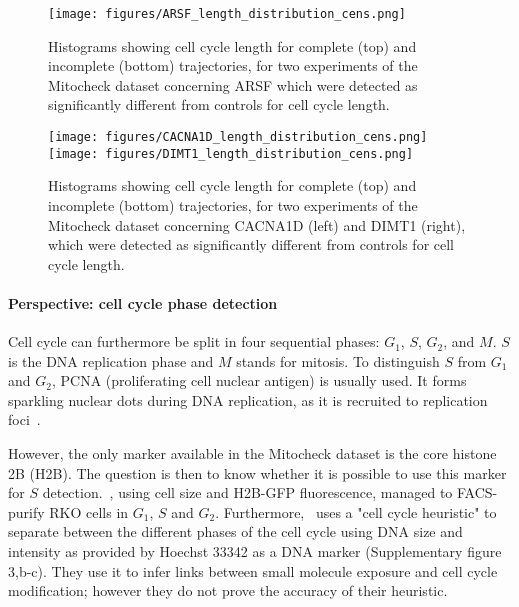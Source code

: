 \begin{figure*}[ht!]
\centerline{\texttt{[image: figures/ARSF\_length\_distribution\_cens.png]}}
\caption{Histograms showing cell cycle length for complete (top) and incomplete (bottom) trajectories, for two experiments of the Mitocheck dataset concerning ARSF which were detected as significantly different from controls for cell cycle length.}
\label{ARSF}
\end{figure*}
\begin{figure*}[ht!]
\centerline{\texttt{[image: figures/CACNA1D\_length\_distribution\_cens.png]}
\texttt{[image: figures/DIMT1\_length\_distribution\_cens.png]}
}
\caption{Histograms showing cell cycle length for complete (top) and incomplete (bottom) trajectories, for two experiments of the Mitocheck dataset concerning CACNA1D (left) and DIMT1 (right), which were detected as significantly different from controls for cell cycle length.}
\label{CAC}
\end{figure*}

\paragraph*{Perspective: cell cycle phase detection\\}
Cell cycle can furthermore be split in four sequential phases: $G_1$, $S$, $G_2$, and $M$. $S$ is the DNA replication phase and $M$ stands for mitosis. To distinguish $S$ from $G_1$ and $G_2$, PCNA (proliferating cell nuclear antigen) is usually used. It forms sparkling nuclear dots during DNA replication, as it is recruited to replication foci~\cite{pmid10769021}.

However, the only marker available in the Mitocheck dataset is the
core histone 2B (H2B). The question is then to know whether it is
possible to use this marker for $S$ detection.~\cite{pmid16765323},
using cell size and H2B-GFP fluorescence, managed to FACS-purify RKO
cells in $G_1$, $S$ and $G_2$. %
Furthermore,~\cite{pmid17401369} uses a "cell cycle heuristic" to
 separate between the different phases of the cell cycle using DNA
 size and intensity as provided by Hoechst 33342 as a DNA marker
 (Supplementary figure 3,b-c). They use it to infer links between
 small molecule exposure and cell cycle modification; however they do
 not prove the accuracy of their heuristic. 

